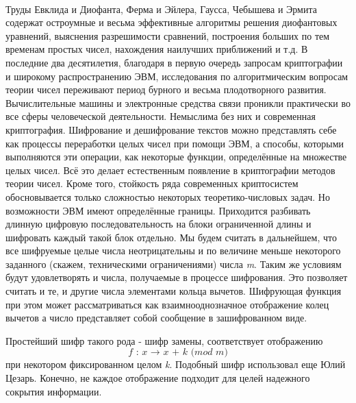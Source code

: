 \paragraph{} Труды Евклида и Диофанта, Ферма и Эйлера, Гаусса, Чебышева и Эрмита содержат остроумные и весьма эффективные алгоритмы решения диофантовых 
уравнений, выяснения разрешимости сравнений, построения больших по тем временам простых чисел, нахождения наилучших приближений и т.д. В последние два 
десятилетия, благодаря в первую очередь запросам криптографии и широкому распространению ЭВМ, исследования по алгоритмическим вопросам теории чисел 
переживают период бурного и весьма плодотворного развития. Вычислительные машины и электронные средства связи проникли практически во все сферы 
человеческой деятельности. Немыслима без них и современная криптография. Шифрование и дешифрование текстов можно представлять себе как процессы 
переработки целых чисел при помощи ЭВМ, а способы, которыми выполняются эти операции, как некоторые функции, определённые на множестве целых чисел. 
Всё это делает естественным появление в криптографии методов теории чисел. Кроме того, стойкость ряда современных криптосистем обосновывается только 
сложностью некоторых теоретико-числовых задач. Но возможности ЭВМ имеют определённые границы. Приходится разбивать длинную цифровую последовательность 
на блоки ограниченной длины и шифровать каждый такой блок отдельно. Мы будем считать в дальнейшем, что все шифруемые целые числа неотрицательны и по 
величине меньше некоторого заданного (скажем, техническими ограничениями) числа \textit{m}. Таким же условиям будут удовлетворять и числа, получаемые 
в процессе шифрования. Это позволяет считать и те, и другие числа элементами кольца вычетов. Шифрующая функция при этом может рассматриваться как 
взаимнооднозначное отображение колец вычетов а число  представляет собой сообщение  в зашифрованном виде.

Простейший шифр такого рода - шифр замены, соответствует отображению
\begin{equation}
    \textit{f : x {$\rightarrow$} x + k (mod m)}
\end{equation}
при некотором фиксированном целом \textit{k}. Подобный шифр использовал еще Юлий Цезарь. Конечно, не каждое отображение  подходит для целей надежного 
сокрытия информации.

